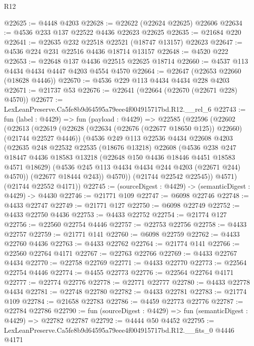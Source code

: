 \begin{lexlean}{R12}
\begin{coremodule}
@22625 := @4448 @4203
@22628 := @22622 (@22624 @22625) @22606
@22634 := @4536 @233 @137 @22522 @4436 @22623 @22625
@22635 := @21684 @220
@22641 := @22635 @232 @22518 @22521 (@18747 @13157) @22623
@22647 := @4536 @224 @231 @22516 @4436 @18714 @13157
@22648 := @4520 @222
@22653 := @22648 @137 @4436 @22515 @22625 @18714
@22660 := @4537 @113 @4434 @4434 @4447 @4203 @4554 @4570
@22664 := @22647 (@22653 @22660 (@18628 @4446))
@22670 := @4536 @229 @113 @4434 @4434 @228 @4203
@22671 := @21737 @53
@22676 := @22641 (@22664 (@22670 (@22671 @228) @4570))
@22677 := LexLeanPreserve.Ca5fe8b9d64595a79eee4f004915717bd.R12.__rel_6
@22743 := fun (label : @4429) =>
  fun (payload : @4429) =>
  @22585
    (@22596
      (@22602
        (@22613
          (@22619
            (@22628 (@22634 (@22676 (@22677 @18650 @125)) @22660) (@21744 @22527 @4446))
            (@4536
              @249
              @113
              @22536
              @4434
              @22608
              @4203
              (@22635
                @248
                @22532
                @22535
                (@18676 @13218)
                @22608
                (@4536
                  @238
                  @247
                  @18447
                  @4436
                  @18583
                  @13218
                  (@22648 @150 @4436 @18446 @4451 @18583 @4571 @18629)
                  (@4536 @245 @113 @4434 @4434 @244 @4203 (@22671 @244) @4570))
                (@22677 @18444 @243))
              @4570))
          (@21744 @22542 @22545))
        @4571)
      (@21744 @22552 @4171))
@22745 := (sourceDigest : @4429) -> (semanticDigest : @4429) -> @4430
@22746 := @21771 @109
@22747 := @6098 @22746
@22748 := @4433 @22747
@22749 := @21771 @127
@22750 := @6098 @22749
@22752 := @4433 @22750 @4436
@22753 := @4433 @22752
@22754 := @21774 @127
@22756 := @22560 @22754 @4446
@22757 := @22753 @22756
@22758 := @4433 @22757
@22759 := @21771 @141
@22760 := @6098 @22759
@22762 := @4433 @22760 @4436
@22763 := @4433 @22762
@22764 := @21774 @141
@22766 := @22560 @22764 @4171
@22767 := @22763 @22766
@22769 := @4433 @22767 @4434
@22770 := @22758 @22769
@22771 := @4433 @22770
@22773 := @22564 @22754 @4446
@22774 := @4455 @22773
@22776 := @22564 @22764 @4171
@22777 := @22774 @22776
@22778 := @22771 @22777
@22780 := @4433 @22778 @4434
@22781 := @22748 @22780
@22782 := @4433 @22781
@22783 := @21774 @109
@22784 := @21658 @22783
@22786 := @4459 @22773 @22776
@22787 := @22784 @22786
@22790 := fun (sourceDigest : @4429) => fun (semanticDigest : @4429) => @22782 @22787
@22792 := @4444 @50 @4452
@22795 := LexLeanPreserve.Ca5fe8b9d64595a79eee4f004915717bd.R12.__fits_0 @4446 @4171

\end{coremodule}
\end{lexlean}
